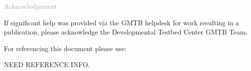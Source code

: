 \begin{titlepage}
\vspace*{0.5cm}
\noindent

\begin{flushleft}
\textcolor{darkgray}{\LARGE Acknowledgement}
\vspace*{1cm}\par

If significant help was provided via the GMTB helpdesk for work resulting in a publication, please acknowledge the Developmental Testbed Center GMTB Team.\\
\vspace*{1cm}\par
For referencing this document please use:\\ 
\vspace*{1cm}\par
NEED REFERENCE INFO.

\end{flushleft}
\end{titlepage}
\pagebreak{}




